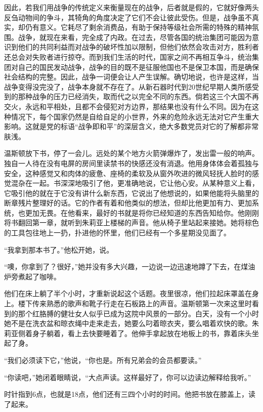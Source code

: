 因此，若我们用战争的传统定义来衡量现在的战争，后者就是假的，它就好像两头反刍动物间的争斗，其犄角的角度决定了它们不会让彼此受伤。但是，战争虽不真实，却仍有意义。它耗尽了剩余消费品，有助于保持等级社会所需的特殊的精神氛围。战争，就现在来看，完全成了内政。在过去，尽管各国的统治集团可能因为意识到他们的共同利益而对战争的破坏性加以限制，但他们依然会攻击对方，胜利者还总会对失败者进行掠夺。而到我们生活的时代，国家之间不再相互争斗，统治集团对自己的国民发动战争，战争的目的既不是征服他国也不是保卫本国，而是确保社会结构的完整。因此，战争一词便会让人产生误解。确切地说，也许是这样，当战争变得没完没了，战争本身就不存在了。从新石器时代到20世纪早期人类所感受到的那种战争的压力已经消失，取而代之以完全不同的东西。倘若这三个大国不再交火，永远和平相处，且都不会侵犯对方边界，那结果也没有什么不同。因为在这种情况下，每个国家仍然是自给自足的小世界，外来的危险永远无法对它产生重大影响。这就是党的标语``战争即和平''的深层含义，绝大多数党员对它的了解都非常肤浅。

温斯顿放下书，停了一会儿。远处的某个地方火箭弹爆炸了，发出雷一般的响声。独自一人待在没有电屏的房间里读禁书的快感还没有消退。他用身体体会着孤独与安全，这种感觉又和肉体的疲惫、座椅的柔软及从窗外吹进的微风轻抚人脸时的感觉混杂在一起。书深深地吸引了他，更准确地说，它让他心安。从某种意义上看，它吸引他的就在于它没有讲什么新东西，它说出了他想说的，如果他能将头脑里的断章残片整理好的话。它的作者有着和他类似的想法，但却比他更加有力、更加系统，也更加无畏。在他看来，最好的书就是将你已经知道的东西告知给你。他刚刚将书翻回第一章，就听到朱莉亚上楼梯的声音。他从椅子里站起来接她。她将棕色的工具包往地上一扔，扑进他的怀里，他们已经有一个多星期没见面了。

``我拿到那本书了。''他松开她，说。

``噢，你拿到了？很好，''她并没有多大兴趣，一边说一边迅速地蹲了下去，在煤油炉旁煮起了咖啡。

他们在床上躺了半个小时，才重新说起这个话题。夜里很凉，他们拉起床罩盖在身上。楼下传来熟悉的歌声和靴子行走在石板路上的声音。温斯顿第一次来这里时看到的那个红胳膊的健壮女人似乎已成为这院中风景的一部分。白天，没有一个小时她不是在洗衣盆和晾衣绳中走来走去，她要么叼着晾衣夹，要么唱着欢快的歌。朱莉亚侧着身子躺着，看上去快要睡着了。他伸手拿起放在地板上的书，靠着床头坐起了身。

``我们必须读下它，''他说，``你也是。所有兄弟会的会员都要读。''

``你读吧，''她闭着眼睛说，``大点声读。这样最好了，你可以边读边解释给我听。''

时针指到6点，也就是18点，他们还有三四个小时的时间。他把书放在膝盖上，读了起来。

